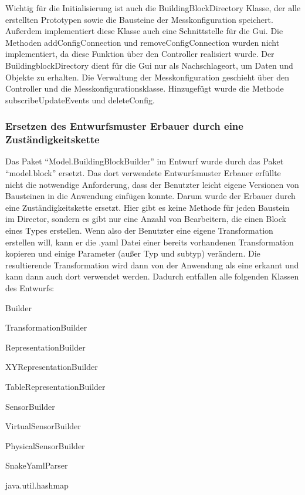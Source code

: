 \documentclass[parskip=full]{scrartcl}
\begin{document}
Wichtig für die Initialisierung ist auch die BuildingBlockDirectory Klasse, der alle erstellten Prototypen sowie die Bausteine der Messkonfiguration speichert. Außerdem implementiert diese Klasse auch eine Schnittstelle für die Gui. Die Methoden addConfigConnection und removeConfigConnection wurden nicht implementiert, da diese Funktion über den Controller realisiert wurde. Der BuildingblockDirectory dient für die Gui nur als Nachschlageort, um Daten und Objekte zu erhalten. Die Verwaltung der Messkonfiguration geschieht über den Controller und die Messkonfigurationsklasse. Hinzugefügt wurde die Methode subscribeUpdateEvents und deleteConfig.


\subsubsection{Ersetzen des Entwurfsmuster Erbauer durch eine Zuständigkeitskette}
Das Paket "`Model.BuildingBlockBuilder"' im Entwurf wurde durch das Paket "`model.block"' ersetzt. Das dort verwendete Entwurfsmuster Erbauer erfüllte nicht die notwendige Anforderung, dass der Benutzter leicht eigene Versionen von Bausteinen in die Anwendung einfügen konnte. Darum wurde der Erbauer durch eine Zuständigkeitskette ersetzt. Hier gibt es keine Methode für jeden Baustein im Director, sondern es gibt nur eine Anzahl von Bearbeitern, die einen Block eines Types erstellen. Wenn also der Benutzter eine eigene Transformation erstellen will, kann er die .yaml Datei einer bereits vorhandenen Transformation kopieren und einige Parameter (außer Typ und subtyp) verändern. Die resultierende Transformation wird dann von der Anwendung als eine erkannt und kann dann auch dort verwendet werden.
Dadurch entfallen alle folgenden Klassen des Entwurfs:

\begin{description}
\item{} Builder
\item{} TransformationBuilder
\item{} RepresentationBuilder
\item{} XYRepresentationBuilder
\item{} TableRepresentationBuilder
\item{} SensorBuilder
\item{} VirtualSensorBuilder
\item{} PhysicalSensorBuilder
\item{} SnakeYamlParser
\item{} java.util.hashmap
\end{description}
\end{document}
